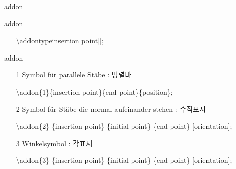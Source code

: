 \documentclass[ aspectratio=169,  12pt,blue,xcolor=pdftex,dvipsnames,table,handout,notes]{beamer}
\begin{document}
		\begin{frame}[t]{addon}
 
			\begin{block}{addon}
			\begin{itemize}
			\item[] \textbackslash addon{type}{insertion point}{}{}[];
			\end{itemize}
			\end{block}


			\begin{block}{addon}
			\begin{itemize}
			\item[1] Symbol für parallele Stäbe : 병렬바
					\par \hspace{2cm} \textbackslash addon\{1\}\{insertion point\}\{end point\}\{position\};
			\item[2] Symbol für Stäbe die normal aufeinander stehen : 수직표시 
					\par \hspace{2cm} \textbackslash addon\{2\}
									\{insertion point\}
									\{initial point\}
									\{end point\}
									[orientation];
			\item[3] Winkelsymbol : 각표시
					\par \hspace{2cm} \textbackslash addon\{3\}
									\{insertion point\}
									\{initial point\}
									\{end point\}
									[orientation];
			\end{itemize}
			\end{block}


\end{frame}
\end{document}
